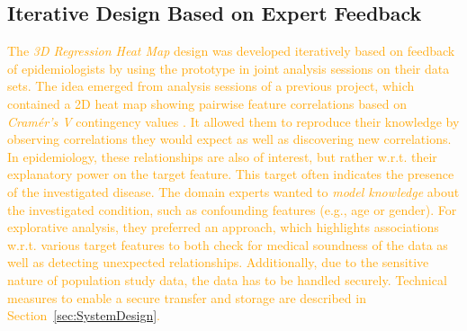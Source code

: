 \documentclass[journal]{style/vgtc} 			          %
\newcommand{\design}[1]{\textcolor{orange}{#1}}
\begin{document}
\subsection{Iterative Design Based on Expert Feedback}
\design{
The \emph{3D Regression Heat Map} design was developed iteratively based on feedback of epidemiologists by using the prototype in joint analysis sessions on their data sets.
The idea emerged from analysis sessions of a previous project, which contained a 2D heat map showing pairwise feature correlations based on \emph{Cram\'{e}r's V} contingency values \cite{Klemm2014VIS}.
It allowed them to reproduce their knowledge by observing correlations they would expect as well as discovering new correlations.
In epidemiology, these relationships are also of interest, but rather w.r.t. their explanatory power on the target feature.
This target often indicates the presence of the investigated disease.
The domain experts wanted to \emph{model knowledge} about the investigated condition, such as confounding features (e.g., age or gender).
For explorative analysis, they preferred an approach, which highlights associations w.r.t. various target features to both check for medical soundness of the data as well as detecting unexpected relationships.
Additionally, due to the sensitive nature of population study data, the data has to be handled securely.
Technical measures to enable a secure transfer and storage are described in Section~\ref{sec:SystemDesign}.
}
\end{document}
